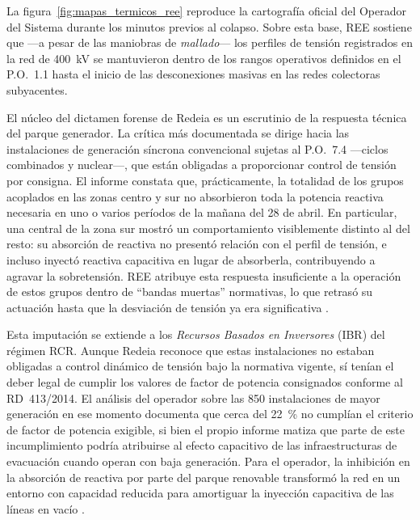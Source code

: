 La figura~\ref{fig:mapas_termicos_ree} reproduce la cartografía oficial
del Operador del Sistema durante los minutos previos al colapso. Sobre
esta base, REE sostiene que ---a pesar de las maniobras de
\textit{mallado}--- los perfiles de tensión registrados en la red de
400~kV se mantuvieron dentro de los rangos operativos definidos en el
P.O.~1.1 hasta el inicio de las desconexiones masivas en las redes
colectoras subyacentes.

El núcleo del dictamen forense de Redeia es un escrutinio de la respuesta
técnica del parque generador. La crítica más documentada se dirige hacia
las instalaciones de generación síncrona convencional sujetas al
P.O.~7.4 ---ciclos combinados y nuclear---, que están obligadas a
proporcionar control de tensión por consigna. El informe constata que,
prácticamente, la totalidad de los grupos acoplados en las zonas centro y
sur no absorbieron toda la potencia reactiva necesaria en uno o varios
períodos de la mañana del 28 de abril. En particular, una central de la
zona sur mostró un comportamiento visiblemente distinto al del resto: su
absorción de reactiva no presentó relación con el perfil de tensión, e
incluso inyectó reactiva capacitiva en lugar de absorberla, contribuyendo
a agravar la sobretensión. REE atribuye esta respuesta insuficiente a la
operación de estos grupos dentro de ``bandas muertas'' normativas, lo que
retrasó su actuación hasta que la desviación de tensión ya era
significativa \cite{ree2025}.

Esta imputación se extiende a los \textit{Recursos Basados en Inversores}
(IBR) del régimen RCR. Aunque Redeia reconoce que estas instalaciones no
estaban obligadas a control dinámico de tensión bajo la normativa
vigente, sí tenían el deber legal de cumplir los valores de factor de
potencia consignados conforme al RD~413/2014. El análisis del operador
sobre las 850 instalaciones de mayor generación en ese momento documenta
que cerca del 22~\% no cumplían el criterio de factor de potencia
exigible, si bien el propio informe matiza que parte de este
incumplimiento podría atribuirse al efecto capacitivo de las
infraestructuras de evacuación cuando operan con baja generación. Para
el operador, la inhibición en la absorción de reactiva por parte del
parque renovable transformó la red en un entorno con capacidad reducida
para amortiguar la inyección capacitiva de las líneas en vacío
\cite{ree2025}.

